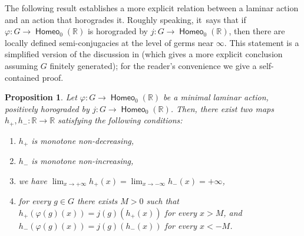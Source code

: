 \documentclass[JEP,XML,SOM,Unicode,NoFloatCountersInSection,published]{cedram}
\newtheorem{prop}[thm]{Proposition}
\theoremstyle{definition}
\DeclareMathOperator{\homeo}{\mathsf{Homeo}}
\newcommand{\R}{\mathbb{R}}
\begin{document}
The following result establishes a more explicit relation between a laminar action and an action that horogrades it. Roughly speaking, it~says that if $\varphi \colon G\to \homeo_0(\R)$ is horograded by $j\colon G\to \homeo_0(\R)$, then there are locally defined semi-conjugacies at the level of germs near $\infty$. This statement is a simplified version of the discussion in \cite[\S 15.1]{BMRT} (which gives a more explicit conclusion assuming $G$ finitely generated); for the reader's convenience we give a self-contained proof.

\begin{prop}\label{p-horograding-germ}
Let $\varphi \colon G\to \homeo_0(\R)$ be a minimal laminar action, positively horograded by $j\colon G\to \homeo_0(\R)$.
Then, there exist two maps $h_+, h_-\colon \R\to \R$ satisfying the following conditions:
\begin{enumerate}
\item $h_+$ is monotone non-decreasing,
\item $h_-$ is monotone non-increasing,
\item \label{i-maps-proper} we have $\lim_{x\to +\infty}h_+(x)=\lim_{x\to -\infty} h_-(x)=+\infty$,
\item \label{i-partial-equivariance} for every $g
\in G$ there exists $M>0$ such that $ h_+(\varphi(g)(x))=j(g) (h_+(x))$ for every $x>M$, and $ h_-(\varphi(g)(x))=j(g)(h_-(x))$ for every $x<-M$.
\end{enumerate}
\end{prop}
\end{document}

